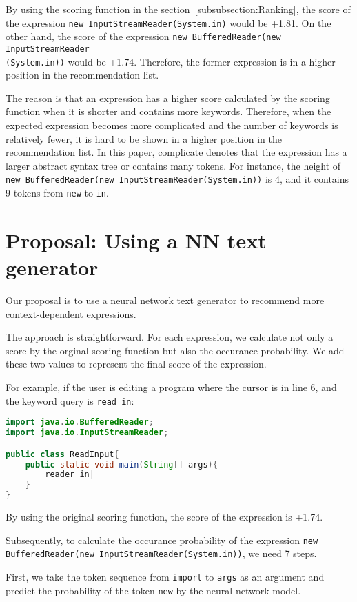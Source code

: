 \documentclass[PRO,english]{ipsj}
\begin{document}
By using the scoring function in the section~\ref{subsubsection:Ranking}, the score of the expression \texttt{new InputStreamReader(System.in)} would be +1.81. On the other hand, the score of the expression \texttt{new BufferedReader(new InputStreamReader}\\\texttt{(System.in))} would be +1.74. Therefore, the former expression is in a higher position in the recommendation list.

The reason is that an expression has a higher score calculated by the scoring function when it is shorter and contains more keywords. Therefore, when the expected expression becomes more complicated and the number of keywords is relatively fewer, it is hard to be shown in a higher position in the recommendation list. In this paper, complicate denotes that the expression has a larger abstract syntax tree or contains many tokens. For instance, the height of \texttt{new BufferedReader(new InputStreamReader(System.in))} is 4, and it contains 9 tokens from \texttt{new} to \texttt{in}.

\section{Proposal: Using a NN text generator}
Our proposal is to use a neural network text generator to recommend more context-dependent expressions.

The approach is straightforward. For each expression, we calculate not only a score by the orginal scoring function but also the occurance probability. We add these two values to represent the final score of the expression.

For example, if the user is editing a program where the cursor is in line 6, and the keyword query is \texttt{read in}:
\begin{lstlisting}[language=Java]
import java.io.BufferedReader;
import java.io.InputStreamReader;

public class ReadInput{
	public static void main(String[] args){
	    reader in|
	}
}
\end{lstlisting}

By using the original scoring function, the score of the expression is +1.74. 

Subsequently, to calculate the occurance probability of the expression \texttt{new BufferedReader(new InputStreamReader(System.in))}, we need 7 steps. 

First, we take the token sequence from \texttt{import} to \texttt{args} as an argument and predict the probability of the token \texttt{new} by the neural network model. 
\end{document}
